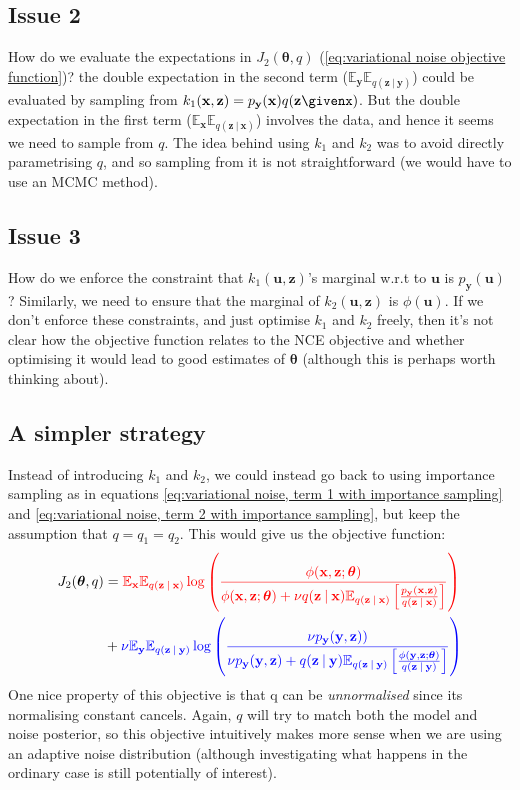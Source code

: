 \documentclass[11pt, oneside]{article}
\newcommand{\thetab}{{\boldsymbol{\theta}}}
\newcommand{\pnn}{\phi}
\newcommand{\pnoise}{p_{ \mathbf y}}
\renewcommand{\u}{{\mathbf u}}
\newcommand{\x}{{\mathbf x}}
\newcommand{\y}{{\mathbf y}}
\newcommand{\z}{{\mathbf z}}
\newcommand{\E}{\mathbb{E}}
\newcommand{\Ex}{\E_{\x}}
\newcommand{\Ey}{\E_{\y}}
\newcommand\given[1][]{\:#1\vert\:}
\theoremstyle{definition}
\begin{document}
{\subsection*{Issue 2}
How do we evaluate the expectations in $J_2(\thetab, q)$ (\ref{eq:variational noise objective function})? the double expectation in the second term ($\Ey \mathbb{E}_{q(\z \given \y)}$) could be evaluated by sampling from $k_1(\x, \z) = \pnoise(\x) q(\z \givenx)$. But the double expectation in the first term ($\Ex \mathbb{E}_{q(\z \given \x)}$) involves the data, and hence it seems we need to sample from $q$. The idea behind using $k_1$ and $k_2$ was to avoid directly parametrising $q$, and so sampling from it is not straightforward (we would have to use an MCMC method).

\subsection*{Issue 3}
How do we enforce the constraint that $k_1(\u, \z)$'s marginal w.r.t to $\u$ is $\pnoise(\u)$? Similarly, we need to ensure that the marginal of $k_2(\u, \z)$ is $\pnn(\u)$. If we don't enforce these constraints, and just optimise $k_1$ and $k_2$ freely, then it's not clear how the objective function relates to the NCE objective and whether optimising it would lead to good estimates of $\thetab$ (although this is perhaps worth thinking about).

\subsection{A simpler strategy}
Instead of introducing $k_1$ and $k_2$, we could instead go back to using importance sampling as in equations \ref{eq:variational noise, term 1 with importance sampling} and \ref{eq:variational noise, term 2 with importance sampling}, but keep the assumption that $q = q_1 = q_2$. This would give us the objective function: 
\begin{align}
\label{eq:variational noise objective function with importance sampling}
    J_2(\thetab, q) &= \color{red}{\Ex \mathbb{E}_{q(\z \given \x)} \log \left( \frac{\pnn(\x,\z; \thetab)}{\pnn(\x,\z; \thetab) + \nu q(\z \given \x) \mathbb{E}_{q(\z \given \x)} \left[ \frac{\pnoise(\x, \z)}{q(\z \given \x)} \right]} \right)} \\
    &+ \color{blue}{ \nu \Ey \mathbb{E}_{q(\z \given \y)} \log \left( \frac{\nu \pnoise(\y, \z))}{\nu \pnoise(\y, \z) +  q(\z \given \y)\mathbb{E}_{q(\z \given \y)}\left[ \frac{\pnn(\y , \z; \thetab)}{q(\z \given \y)} \right] } \right)}
\end{align}
One nice property of this objective is that q can be \emph{unnormalised} since its normalising constant cancels. Again, $q$ will try to match both the model and noise posterior, so this objective intuitively makes more sense when we are using an adaptive noise distribution (although investigating what happens in the ordinary case is still potentially of interest).

}
\end{document}
